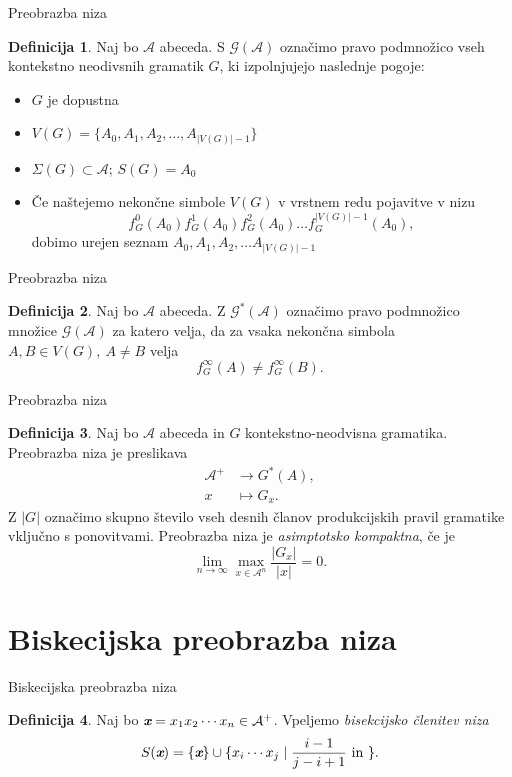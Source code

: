 \documentclass{beamer}
\newcommand{\G}{\mathcal{G}}
\newcommand{\A}{\mathcal{A}}
\newcommand{\x}{\textit{\textbf{x}}}
\theoremstyle{definition} %
\newtheorem{definicija}{Definicija}[section]
\begin{document}
\begin{frame}{Preobrazba niza}
    \begin{definicija}
        Naj bo $\A$ abeceda. S $ \G(\A) $ označimo pravo podmnožico vseh kontekstno neodivsnih gramatik
        $G$, ki izpolnjujejo naslednje pogoje:
        \begin{itemize}
            \item<1-> $G$ je dopustna
            \item<2-> $ V(G) = \{ A_0, A_1, A_2, \ldots, A_{|V(G)| - 1} \} $
            \item<3-> $ \Sigma(G) \subset \A $; $ S(G) = A_0 $
            \item<4-> Če naštejemo nekončne simbole $V(G)$ v vrstnem redu pojavitve v nizu
            \[
            f_G^0(A_0) f_G^1(A_0) f_G^2(A_0) \dots f_G^{|V(G)| - 1}(A_0),
            \]
            dobimo urejen seznam $ A_0, A_1, A_2, \ldots A_{|V(G)| - 1} $
        \end{itemize}
    \end{definicija}
\end{frame}

\begin{frame}{Preobrazba niza}
    \begin{definicija}
        Naj bo $\A$ abeceda. Z $\G^*(\A)$ označimo pravo podmnožico množice $\G(\A)$ za katero velja, da za vsaka nekončna simbola $ A,B \in V(G), \ A \neq B $ velja
        \[
            f_G^\infty(A) \neq f_G^\infty(B).
        \]
    \end{definicija}
\end{frame}

\begin{frame}{Preobrazba niza}
    \begin{definicija}
        Naj bo $\A$ abeceda in $G$ kontekstno-neodvisna gramatika. 
        Preobrazba niza je preslikava
        \begin{align*}
            \A^+ &\rightarrow G^*(A), \\
            x &\mapsto G_x.
        \end{align*}
        \pause
        Z $|G|$ označimo skupno število vseh desnih članov produkcijskih pravil gramatike vključno s ponovitvami. Preobrazba niza je \textit{asimptotsko kompaktna}, če je
        \[
            \lim_{n \rightarrow \infty} \max_{x \in \A^n} \frac{|G_x|}{|x|} = 0.
        \]
    \end{definicija}
\end{frame}

\section{Biskecijska preobrazba niza}

\begin{frame}{Biskecijska preobrazba niza}
    \begin{definicija}
        Naj bo $ \x = x_1 x_2 \cdots x_n \in \A^+ $.
        Vpeljemo \textit{bisekcijsko členitev niza}
        \[
            S(\x) = \{ \x \} \cup \{ x_i \cdots x_j \mid \frac{i-1}{j-i+1} \text{ in }  \}.
        \]
    \end{definicija}
\end{frame}
\end{document}
